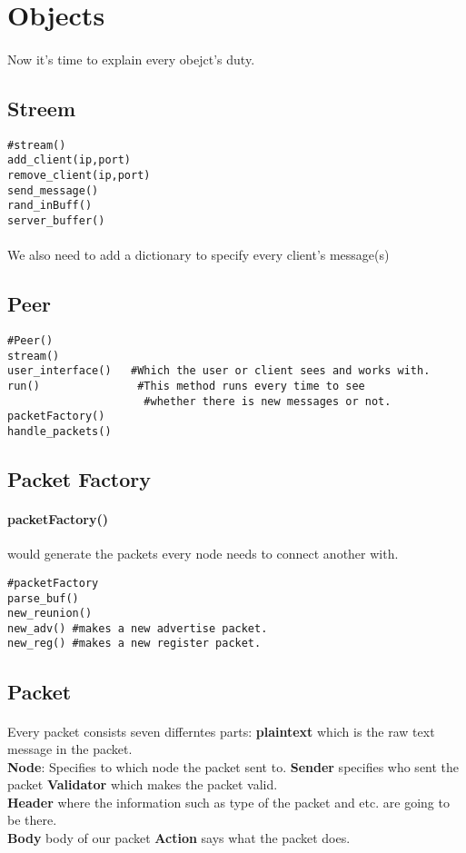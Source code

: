 \documentclass{article}
\begin{document}
\section{Objects}
\paragraph{}Now it's time to explain every obejct's duty.
\subsection{Streem}
\begin{lstlisting}
#stream()
add_client(ip,port)
remove_client(ip,port)
send_message()
rand_inBuff()
server_buffer()
\end{lstlisting}
\paragraph{}We also need to add a dictionary to specify every client's message(s)
\subsection{Peer}
\begin{lstlisting}
#Peer()
stream()
user_interface()   #Which the user or client sees and works with. 
run() 				#This method runs every time to see 
				     #whether there is new messages or not.
packetFactory()
handle_packets()
\end{lstlisting}
\subsection{Packet Factory}
\paragraph{packetFactory()} would generate the packets every node needs to connect another with.
\begin{lstlisting}
#packetFactory
parse_buf()
new_reunion()
new_adv() #makes a new advertise packet.
new_reg() #makes a new register packet.
\end{lstlisting}
\subsection{Packet}
\paragraph{}Every packet consists seven differntes parts: \textbf{plain\underline{\hspace{.05in}}text} which is the raw text message in the packet.\\
\textbf{Node}: Specifies to which node the packet sent to. \textbf{Sender} specifies who sent the packet \textbf{Validator} which makes the packet valid.\\ \textbf{Header} where the information such as type of the packet and etc. are going to be there.\\ \textbf{Body} body of our packet  \textbf{Action} says what the packet does.
\end{document}
